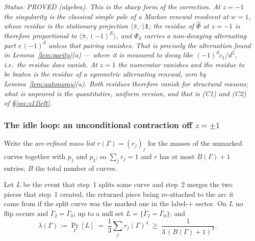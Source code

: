 \emph{Status: PROVED (algebra).  This is the sharp form of the
correction.  At $z=-1$ the singularity is the classical simple pole of
a Markov renewal resolvent at $w=1$, whose residue is the stationary
projection $\langle\bar\pi,\cdot\rangle\mathbf 1$; the residue of
$\widehat\Phi$ at $z=-1$ is therefore proportional to
$\langle\bar\pi,(-1)^{E}\rangle$, and $\Phi_d$ carries a non-decaying
alternating part $c\,(-1)^d$ unless that pairing vanishes.  That is
precisely the alternation found in Lemma~\ref{lem:parity}(a) --- where
it is measured to decay like $(-1)^dc_1/d^2$, i.e.\ the residue does
vanish.  At $z=1$ the numerator vanishes and the residue to be beaten
is the residue of a \emph{symmetric} alternating renewal, zero by
Lemma~\ref{lem:autonomy}(a).  Both residues therefore vanish for
structural reasons; what is unproved is the quantitative, uniform
version, and that is (C1) and (C2) of \S\ref{sec:s11left}.}

\subsubsection{The idle loop: an unconditional contraction off
\texorpdfstring{$z=\pm1$}{z=+-1}}\label{sec:idleloop}

Write the \emph{arc-refined mass list} $r(\Gamma)=(r_j)_j$ for the
masses of the unmarked curves together with $p_1$ and $p_2$; so
$\sum_jr_j=1$ and $r$ has at most $B(\Gamma)+1$ entries, $B$ the total
number of curves.

\begin{lemma}\label{lem:idleloop}
Let $L$ be the event that step~1 splits some curve and step~2 merges
the two pieces that step~1 created, the returned piece being
re-attached to the arc it came from if the split curve was the marked
one in the label-$+$ sector.  On $L$ no flip occurs and
$\bar\Gamma_2=\bar\Gamma_0$; up to a null set
$L=\{\bar\Gamma_2=\bar\Gamma_0\}$; and
\[
\lambda(\Gamma):=\Pr_\Gamma[L]\;=\;\frac13\sum_j r_j(\Gamma)^4
\;\ge\;\frac1{3\,(B(\Gamma)+1)^3}.
\]
\end{lemma}

